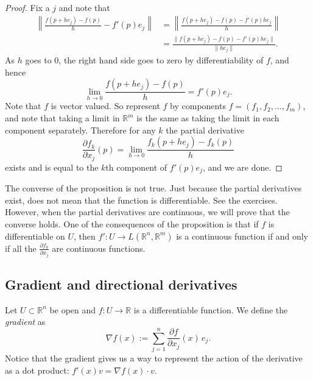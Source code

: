 \documentclass[12pt]{book}
\newcommand{\snorm}[1]{\lVert {#1} \rVert}
\newcommand{\norm}[1]{\left\lVert {#1} \right\rVert}
\newcommand{\R}{{\mathbb{R}}}
\newcommand{\myindex}[1]{#1\index{#1}}
\theoremstyle{plain}
\theoremstyle{remark}
\theoremstyle{definition}
\theoremstyle{exercise}
\theoremstyle{example}
\begin{document}
\begin{proof}
Fix a $j$ and note that
\begin{equation*}
\begin{split}
\norm{\frac{f(p+h e_j)-f(p)}{h} - f'(p) e_j} & = 
\norm{\frac{f(p+h e_j)-f(p) - f'(p) h e_j}{h}} \\
& =
\frac{\snorm{f(p+h e_j)-f(p) - f'(p) h e_j}}{\snorm{h e_j}} .
\end{split}
\end{equation*}
As $h$ goes to 0, the right hand side goes to zero by
differentiability of $f$, and hence
\begin{equation*}
\lim_{h \to 0}
\frac{f(p+h e_j)-f(p)}{h} = f'(p) e_j  .
\end{equation*}
Note that $f$ is vector valued.  So represent $f$ by components
$f = (f_1,f_2,\ldots,f_m)$, and note that taking a limit in $\R^m$
is the same as taking the limit in each component separately.  Therefore
for any $k$
the partial derivative
\begin{equation*}
\frac{\partial f_k}{\partial x_j} (p)
=
\lim_{h \to 0}
\frac{f_k(p+h e_j)-f_k(p)}{h}
\end{equation*}
exists and 
is equal to the $k$th component of $f'(p) e_j$, and we are done.
\end{proof}

The converse of the proposition is not true.  Just because the partial
derivatives exist, does not mean that the function is differentiable.  See
the exercises.
However, when the partial derivatives are continuous, we will prove that the
converse holds.
One of the consequences of the proposition is that if $f$
is differentiable on $U$, then $f' \colon U \to
L(\R^n,\R^m)$ is a continuous function if and only if
all the $\frac{\partial f_k}{\partial x_j}$ are continuous functions.

\subsection{Gradient and directional derivatives}

Let $U \subset \R^n$ be open and $f \colon U \to \R$ is a differentiable
function.  We define
the \emph{\myindex{gradient}} as
\begin{equation*}
\nabla f (x) := \sum_{j=1}^n \frac{\partial f}{\partial x_j} (x)\, e_j .
\end{equation*}
Notice that the gradient gives us a way to represent the action of
the derivative as a dot product: $f'(x)v = \nabla f(x) \cdot v$.
\end{document}
